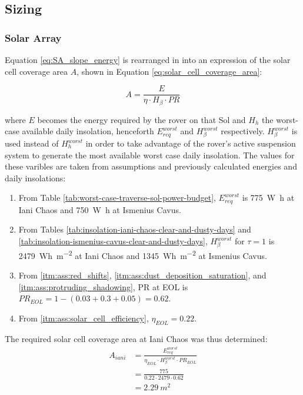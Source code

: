 
\subsection{Sizing}

\subsubsection{Solar Array}
Equation \ref{eq:SA_slope_energy} is rearranged in into an expression of the solar cell coverage area $A$, shown in Equation \ref{eq:solar_cell_coverage_area}:

\begin{equation}
  \label{eq:solar_cell_coverage_area}
  A = \frac{E}{\eta \cdot H_{\beta} \cdot PR}
\end{equation}

where $E$ becomes the energy required by the rover on that Sol and $H_{h}$ the worst-case available daily insolation, henceforth $E_{req}^{worst}$ and $H_{\beta}^{worst}$ respectively. $H_{\beta}^{worst}$ is used instead of $H_{h}^{worst}$ in order to take advantage of the rover's active suspension system to generate the most available worst case daily insolation. The values for these varibles are taken from assumptions and previously calculated energies and daily insolations:

\begin{enumerate}[label=\textbf{\textcolor{BulletBlue}{(\alph*)}}]
    \item From Table \ref{tab:worst-case-traverse-sol-power-budget}, $E_{req}^{worst}$ is \SI{775}{\watt\hour} at Iani Chaos and \SI{750}{\watt\hour} at Ismenius Cavus.
    \item From Tables \ref{tab:insolation-iani-chaos-clear-and-dusty-days} and \ref{tab:insolation-ismenius-cavus-clear-and-dusty-days}, $H_{\beta}^{worst}$ for $\tau=1$ is \SI{2479}{Wh.m^{-2}} at Iani Chaos and \SI{1345}{Wh.m^{-2}} at Ismenius Cavus.
    \item From \ref{itm:ass:red_shifts}, \ref{itm:ass:dust_deposition_saturation}, and \ref{itm:ass:protruding_shadowing}, \ac{PR} at \ac{EOL} is $PR_{EOL} = 1 - (0.03 + 0.3 + 0.05) = 0.62$.
    \item From \ref{itm:ass:solar_cell_efficiency}, $\eta_{EOL} = 0.22$.
\end{enumerate}


The required solar cell coverage area at Iani Chaos was thus determined:
\begin{align}
  \label{calc:solar_cell_area_iani_chaos_traverse}
  A_{iani} &= \frac{E_{req}^{worst}}{\eta_{EOL} \cdot H_{\beta}^{worst} \cdot PR_{EOL}}\\
           &= \frac{775}{0.22 \cdot 2479 \cdot 0.62}\\
           &= \SI{2.29}{m^{2}}
\end{align}

